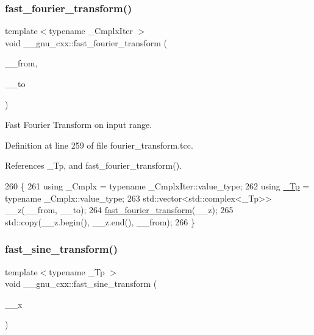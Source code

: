 \subsubsection{\texorpdfstring{fast\+\_\+fourier\+\_\+transform()}{fast\_fourier\_transform()}\hspace{0.1cm}{\footnotesize\ttfamily [3/3]}}
{\footnotesize\ttfamily template$<$typename \+\_\+\+Cmplx\+Iter $>$ \\
void \+\_\+\+\_\+gnu\+\_\+cxx\+::fast\+\_\+fourier\+\_\+transform (\begin{DoxyParamCaption}\item[{const \+\_\+\+Cmplx\+Iter \&}]{\+\_\+\+\_\+from,  }\item[{const \+\_\+\+Cmplx\+Iter \&}]{\+\_\+\+\_\+to }\end{DoxyParamCaption})}

Fast Fourier Transform on input range. 

Definition at line 259 of file fourier\+\_\+transform.\+tcc.



References \+\_\+\+Tp, and fast\+\_\+fourier\+\_\+transform().


\begin{DoxyCode}
260     \{
261       \textcolor{keyword}{using} \_Cmplx = \textcolor{keyword}{typename} \_CmplxIter::value\_type;
262       \textcolor{keyword}{using} \hyperlink{namespace____gnu__cxx_a3b19a9c800ca194374ef9172290f7d79}{\_Tp} = \textcolor{keyword}{typename} \_Cmplx::value\_type;
263       std::vector<std::complex<\_Tp>> \_\_z(\_\_from, \_\_to);
264       \hyperlink{namespace____gnu__cxx_a64fbc0765e55d7466a21baa9f652362e}{fast\_fourier\_transform}(\_\_z);
265       std::copy(\_\_z.begin(), \_\_z.end(), \_\_from);
266     \}
\end{DoxyCode}
\mbox{\label{namespace____gnu__cxx_a97f96274ac4998cf6a7c37fcb48c9bff}} 
\subsubsection{\texorpdfstring{fast\+\_\+sine\+\_\+transform()}{fast\_sine\_transform()}}
{\footnotesize\ttfamily template$<$typename \+\_\+\+Tp $>$ \\
void \+\_\+\+\_\+gnu\+\_\+cxx\+::fast\+\_\+sine\+\_\+transform (\begin{DoxyParamCaption}\item[{std\+::vector$<$ \hyperlink{namespace____gnu__cxx_a3b19a9c800ca194374ef9172290f7d79}{\+\_\+\+Tp} $>$ \&}]{\+\_\+\+\_\+x }\end{DoxyParamCaption})}

